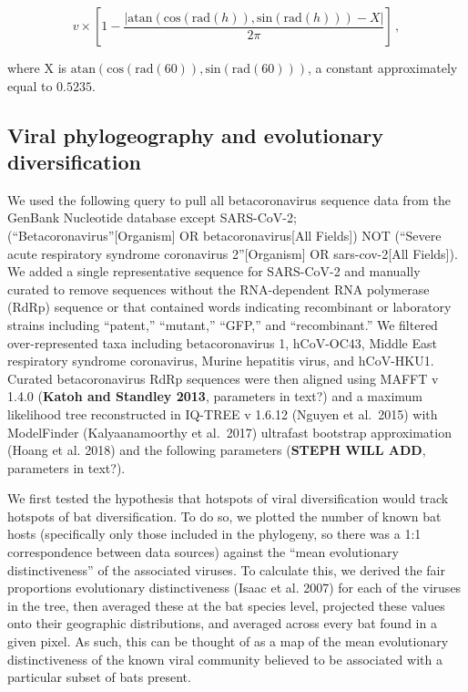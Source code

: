 \documentclass[11pt]{article}
\begin{document}
\[
v\times\left[1-\frac{\left|\text{atan}\left(\text{cos}(\text{rad}(h)), \text{sin}(\text{rad}(h))\right) - X\right|}{2\pi}\right]\,,
\]

where X is
\(\text{atan}\left(\text{cos}(\text{rad}(60)), \text{sin}(\text{rad}(60))\right)\),
a constant approximately equal to \(0.5235\).

\hypertarget{viral-phylogeography-and-evolutionary-diversification}{%
\subsection{Viral phylogeography and evolutionary
diversification}\label{viral-phylogeography-and-evolutionary-diversification}}

We used the following query to pull all betacoronavirus sequence data
from the GenBank Nucleotide database except SARS-CoV-2;
(``Betacoronavirus''{[}Organism{]} OR betacoronavirus{[}All Fields{]})
NOT (``Severe acute respiratory syndrome coronavirus 2''{[}Organism{]}
OR sars-cov-2{[}All Fields{]}). We added a single representative
sequence for SARS-CoV-2 and manually curated to remove sequences without
the RNA-dependent RNA polymerase (RdRp) sequence or that contained words
indicating recombinant or laboratory strains including ``patent,''
``mutant,'' ``GFP,'' and ``recombinant.'' We filtered over-represented
taxa including betacoronavirus 1, hCoV-OC43, Middle East respiratory
syndrome coronavirus, Murine hepatitis virus, and hCoV-HKU1. Curated
betacoronavirus RdRp sequences were then aligned using MAFFT v 1.4.0
(\textbf{Katoh and Standley 2013}, parameters in text?) and a maximum
likelihood tree reconstructed in IQ-TREE v 1.6.12 (Nguyen et al.~2015)
with ModelFinder (Kalyaanamoorthy et al.~2017) ultrafast bootstrap
approximation (Hoang et al. 2018) and the following parameters
(\textbf{STEPH WILL ADD}, parameters in text?).

We first tested the hypothesis that hotspots of viral diversification
would track hotspots of bat diversification. To do so, we plotted the
number of known bat hosts (specifically only those included in the
phylogeny, so there was a 1:1 correspondence between data sources)
against the ``mean evolutionary distinctiveness'' of the associated
viruses. To calculate this, we derived the fair proportions evolutionary
distinctiveness (Isaac et al. 2007) for each of the viruses in the tree,
then averaged these at the bat species level, projected these values
onto their geographic distributions, and averaged across every bat found
in a given pixel. As such, this can be thought of as a map of the mean
evolutionary distinctiveness of the known viral community believed to be
associated with a particular subset of bats present.
\end{document}
